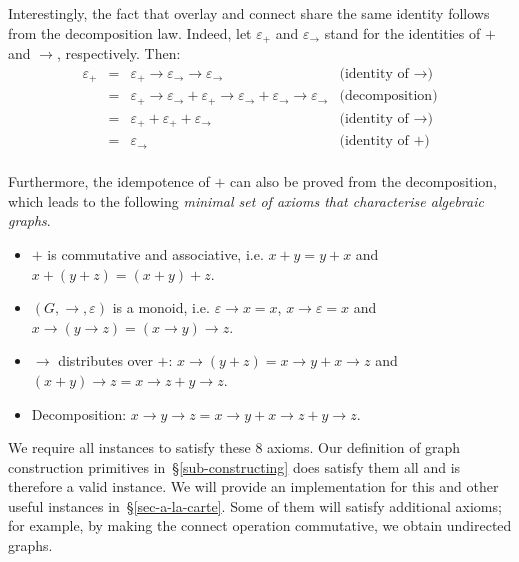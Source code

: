 Interestingly, the fact that overlay and connect share the same identity
follows from the decomposition law. Indeed, let $\varepsilon_{+}$ and
$\varepsilon_{\rightarrow}$ stand for the identities of $+$ and $\rightarrow$,
respectively. Then:
\[
\begin{array}{rcll}
\varepsilon_{+} & = & \varepsilon_{+} \rightarrow \varepsilon_{\rightarrow} \rightarrow \varepsilon_{\rightarrow} & \text{(identity of $\rightarrow$)}\\
 & = & \varepsilon_{+} \rightarrow \varepsilon_{\rightarrow} + \varepsilon_{+} \rightarrow \varepsilon_{\rightarrow} + \varepsilon_{\rightarrow} \rightarrow \varepsilon_{\rightarrow} & \text{(decomposition)}\\
 & = & \varepsilon_{+} + \varepsilon_{+} + \varepsilon_{\rightarrow} & \text{(identity of $\rightarrow$)}\\
 & = & \varepsilon_{\rightarrow} & \text{(identity of $+$)}\\
\end{array}
\]

\noindent
Furthermore, the idempotence of $+$ can also be proved from the decomposition, which
leads to the following \emph{minimal set of axioms that characterise algebraic graphs}.

\begin{itemize}
    \item $+$ is commutative and associative, i.e. $x + y = y + x$ and
    $x + (y + z) = (x + y) + z$.
    \item $(G, \rightarrow, \varepsilon)$ is a monoid, i.e.
    $\varepsilon \rightarrow x = x$, $x \rightarrow \varepsilon = x$ and
    $x \rightarrow (y \rightarrow z) = (x \rightarrow y) \rightarrow z$.
    \item $\rightarrow$ distributes over $+$:
    $x \rightarrow (y + z) = x \rightarrow y + x \rightarrow z$ and
    $(x + y) \rightarrow z = x \rightarrow z + y \rightarrow z$.
    \item Decomposition: $x \rightarrow y \rightarrow z =
    x \rightarrow y + x \rightarrow z + y \rightarrow z$.
\end{itemize}

We require all  instances to satisfy these 8 axioms. Our definition
of graph construction primitives in~\S\ref{sub-constructing} does satisfy them
all and is therefore a valid  instance. We will provide an
implementation for this and other useful instances in~\S\ref{sec-a-la-carte}.
Some of them will satisfy additional
axioms; for example, by making the connect operation commutative,
we obtain undirected graphs.

